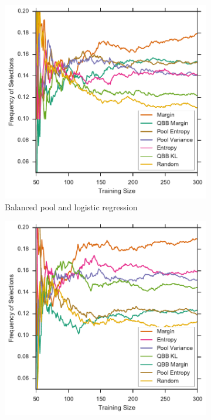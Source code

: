 \begin{figure}[p]
	\centering
	\begin{subfigure}{.5\textwidth}
		\centering
		\includegraphics[width=\textwidth]{figures/5_thompson/sdss_bl_frequencies}
		\caption{Balanced pool and logistic regression}
		\label{fig:sdss_bl_frequencies}
	\end{subfigure}%
	\begin{subfigure}{.5\textwidth}
		\centering
		\includegraphics[width=\linewidth]{figures/5_thompson/sdss_br_frequencies}

\end{subfigure}
\end{figure}
